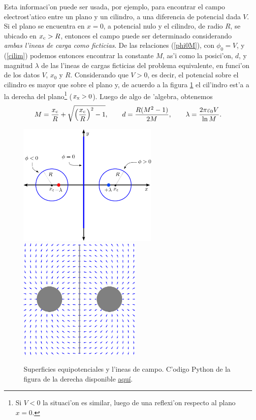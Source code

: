 Esta informaci'on puede ser usada, por ejemplo, para encontrar el campo
electrost'atico entre un plano y un cilindro, a una diferencia de potencial
dada $V$. Si el plano se encuentra en $x=0$, a potencial nulo y el cilindro, de
radio $R$, se ubicado en $x_{\rm c}>R$, entonces el campo puede ser determinado
considerando \textit{ambas l'ineas de carga como ficticias}. De las relaciones
(\ref{phi0M}), con $\phi_0=V$, y (\ref{cilim}) podemos entonces encontrar la
constante $M$, as'i como la posici'on, $d$, y magnitud $\lambda$ de las l'ineas
de cargas ficticias del problema equivalente, en funci'on de los datos $V$,
$x_0$ y $R$. Considerando que $V>0$, es decir, el potencial sobre el cilindro es mayor que sobre el plano y, de acuerdo a la figura \ref{ci04} el cil'indro est'a a la derecha del plano\footnote{Si $V<0$ la situaci'on es similar, luego de una reflexi'on respecto al plano $x=0$.} ($x_{\rm x}>0$). Luego de algo de 'algebra, obtenemos
\begin{equation}
 M=\frac{x_{\rm c}}{R}+\sqrt{\left(\frac{x_{\rm c}}{R}\right)^2-1}, \qquad
d=\frac{R(M^2-1)}{2M}, \qquad \lambda=\frac{2\pi\varepsilon_0V}{\ln M}.
\end{equation}
\begin{figure}[!h]
\centerline{\includegraphics[height=6cm]{fig/fig-metodo-imagenes-cilindros-02.pdf}
\hspace{1cm}
\includegraphics[height=6cm]{fig/fig-metodo-imagenes-cilindros-03.pdf}}
\caption{Superficies equipotenciales y l'ineas de campo. C'odigo Python de la figura de la derecha disponible \href{https://github.com/gfrubi/electrodinamica/blob/master/figuras-editables/fig-metodo-imagenes-cilindros-03.py}{aqu\'i}.}
\label{ci04}
\end{figure}

